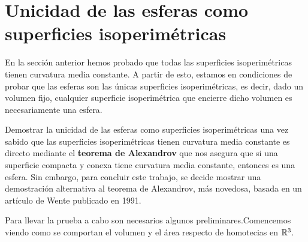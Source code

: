 \section{Unicidad de las esferas como superficies isoperimétricas}

En la sección anterior hemos probado que todas las superficies isoperimétricas tienen curvatura media constante. A partir de esto, estamos en condiciones de probar que las esferas son las únicas superficies isoperimétricas, es decir, dado un volumen fijo, cualquier superficie isoperimétrica que encierre dicho volumen es necesariamente una esfera.

Demostrar la unicidad de las esferas como superficies isoperimétricas una vez sabido que las superficies isoperimétricas tienen curvatura media constante es directo mediante el \textbf{teorema de Alexandrov} que nos asegura que si una superficie compacta y conexa tiene curvatura media constante, entonces es una esfera. Sin embargo, para concluir este trabajo, se decide mostrar una demostración alternativa al teorema de Alexandrov, más novedosa, basada en un artículo de Wente \cite{wenteproof} publicado en 1991.

Para llevar la prueba a cabo son necesarios algunos preliminares.Comencemos viendo como se comportan el volumen y el área respecto de homotecias en $\mathbb{R}^3$.

